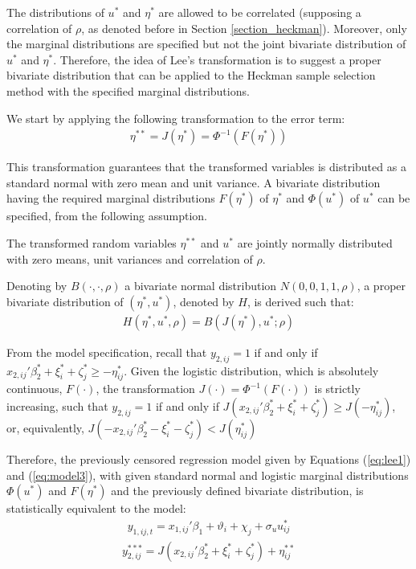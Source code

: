 The distributions of $u^*$ and $\eta^*$ are allowed to be correlated (supposing a correlation of $\rho$, as denoted before in Section \ref{section_heckman}). Moreover, only the marginal distributions are specified but not the joint bivariate distribution of $u^*$ and $\eta^*$. Therefore, the idea of Lee's transformation is to suggest a proper bivariate distribution that can be applied to the Heckman sample selection method with the specified marginal distributions.

We start by applying the following transformation to the error term:
\begin{align*}
\eta^{**} = J(\eta^*) = \Phi^{-1} (F (\eta^*)) 
\end{align*}

This transformation guarantees that the transformed variables is distributed as a standard normal with zero mean and unit variance. A bivariate distribution having the required marginal distributions $F(\eta^*)$ of $\eta^*$ and $\Phi(u^*)$ of $u^*$ can be specified, from the following assumption.

\begin{assumption} \label{assumption_lee_2}
  The transformed random variables $\eta^{**}$ and $u^{*}$ are jointly normally distributed with zero means, unit variances and correlation of $\rho$.
\end{assumption}

Denoting by $B(\cdot, \cdot, \rho)$ a bivariate normal distribution $N(0,0,1,1,\rho)$, a proper bivariate distribution of $(\eta^*, u^*)$, denoted by $H$, is derived such that:
\begin{align*}
H(\eta^*, u^*, \rho) = B ( J(\eta^*), u^*; \rho)
\end{align*}

From the model specification, recall that $y_{2,ij}=1$ if and only if $x_{2,ij}'{\beta_2^*}  +\xi_{i}^*+\zeta_{j}^* \geq - \eta^*_{i j}$. Given the logistic distribution, which is absolutely continuous, $F(\cdot)$, the transformation $J(\cdot) = \Phi^{-1}(F(\cdot))$ is strictly increasing, such that $y_{2,ij}=1$ if and only if $J(x_{2,ij}'{\beta_2^*}  +\xi_{i}^*+\zeta_{j}^* ) \geq J(- \eta^*_{i j})$, or, equivalently, $J(-x_{2,ij}'{\beta_2^*}  -\xi_{i}^*-\zeta_{j}^* ) < J(\eta^*_{i j})$

Therefore, the previously censored regression model given by Equations (\ref{eq:lee1}) and (\ref{eq:model3}), with given standard normal and logistic marginal distributions $\Phi(u^*)$ and $F(\eta^*)$ and the previously defined bivariate distribution, is statistically equivalent to the model:
\begin{align}
y_{1,ij,t} =  x_{1,ij}'\beta_1 + \vartheta_i + \chi_j + \sigma_u u_{ij}^*
\label{eq:lee2}
\end{align}
\begin{align}
    y_{2,i j}^{***}= J(x_{2,ij}'{\beta_2^*}  +\xi_{i}^*+\zeta_{j}^* )+\eta^{**}_{i j}
    \label{eq:lee3}
\end{align}

